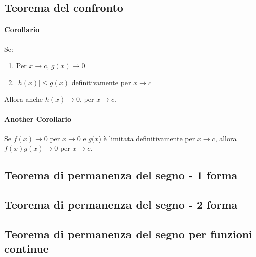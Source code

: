 \documentclass[12pt, a4paper, openany]{book}
\begin{document}
\subsection*{Teorema del confronto}
\paragraph*{Corollario} Se:
\begin{enumerate}
	\item Per $x \rightarrow c, \, g(x) \rightarrow 0$
	\item $|h(x)|\leq g(x)$ definitivamente per $x \rightarrow c$
\end{enumerate}
Allora anche $h(x) \rightarrow 0$, per $x\rightarrow c$.
\paragraph*{Another Corollario}Se $f(x) \rightarrow 0$ per $x \rightarrow 0$ e $g(x$)
è limitata definitivamente per $x \rightarrow c$, allora $f(x)g(x) \rightarrow 0$
per $x \rightarrow c$.
\subsection*{Teorema di permanenza del segno - 1 forma}
\subsection*{Teorema di permanenza del segno - 2 forma}
\subsection*{Teorema di permanenza del segno per funzioni continue}
\end{document}
